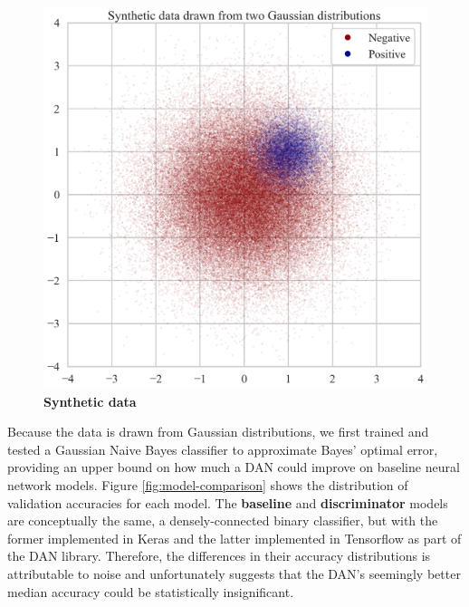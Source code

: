 \documentclass{proc}
\begin{document}
\begin{figure}[h!]
	\begin{center}
		\includegraphics*[scale=0.3]{../figures/synthetic-data.png}
		\caption{\textbf{Synthetic data}}
		\label{fig:synthetic-data}
	\end{center}
\end{figure}

Because the data is drawn from Gaussian distributions, we first trained and tested a Gaussian Naive Bayes classifier to approximate Bayes' optimal error, providing an upper bound on how much a DAN could improve on baseline neural network models. Figure \ref{fig:model-comparison} shows the distribution of validation accuracies for each model. The \textbf{baseline} and \textbf{discriminator} models are conceptually the same, a densely-connected binary classifier, but with the former implemented in Keras and the latter implemented in Tensorflow as part of the DAN library. Therefore, the differences in their accuracy distributions is attributable to noise and unfortunately suggests that the DAN's seemingly better median accuracy could be statistically insignificant.
\end{document}

